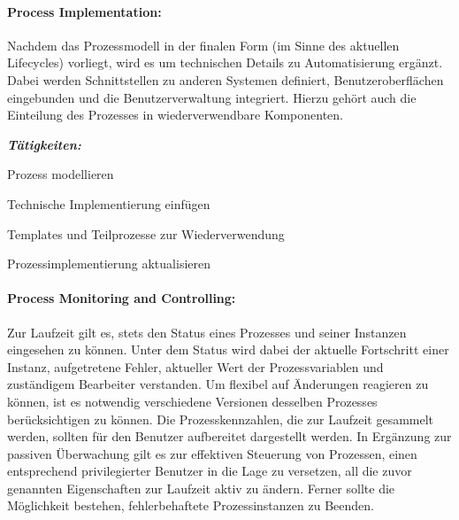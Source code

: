 \paragraph*{Process Implementation:}
Nachdem das Prozessmodell in der finalen Form (im Sinne des aktuellen Lifecycles) vorliegt, wird es um technischen Details zu Automatisierung ergänzt. Dabei werden Schnittstellen zu anderen Systemen definiert, Benutzeroberflächen eingebunden und die Benutzerverwaltung integriert. Hierzu gehört auch die Einteilung des Prozesses in wiederverwendbare Komponenten.

\medskip\textit{\textbf{Tätigkeiten:}}
\begin{compactitem}{}
\item[] Prozess modellieren
\item[] Technische Implementierung einfügen
\item[] Templates und Teilprozesse zur Wiederverwendung
\item[] Prozessimplementierung aktualisieren
\end{compactitem}

%
%


\paragraph*{Process Monitoring and Controlling:}
Zur Laufzeit gilt es, stets den Status eines Prozesses und seiner Instanzen eingesehen zu können. Unter dem Status wird dabei der aktuelle Fortschritt einer Instanz, aufgetretene Fehler, aktueller Wert der Prozessvariablen und zuständigem Bearbeiter verstanden. Um flexibel auf Änderungen reagieren zu können, ist es notwendig verschiedene Versionen desselben Prozesses berücksichtigen zu können. Die Prozesskennzahlen, die zur Laufzeit gesammelt werden, sollten für den Benutzer aufbereitet dargestellt werden.
\newline In Ergänzung zur passiven Überwachung gilt es zur effektiven Steuerung von Prozessen, einen entsprechend privilegierter Benutzer in die Lage zu versetzen, all die zuvor genannten Eigenschaften zur Laufzeit aktiv zu ändern. Ferner sollte die Möglichkeit bestehen, fehlerbehaftete Prozessinstanzen zu Beenden.

